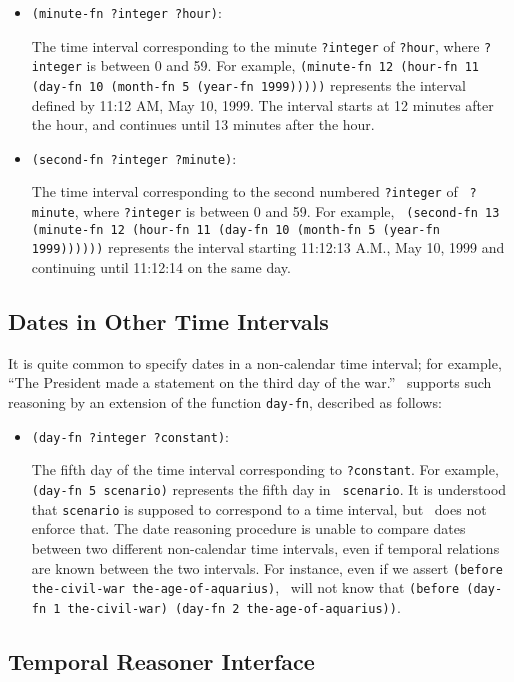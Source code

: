 \begin{itemize}
 \item{\verb'(minute-fn ?integer ?hour)':}

The time interval corresponding to the minute {\tt ?integer} of {\tt ?hour},
where {\tt ?integer} is between 0 and 59.
For example, {\tt (minute-fn 12 (hour-fn 11 (day-fn 10 (month-fn 5 (year-fn
1999)))))} represents the interval defined by 11:12 AM, May 10, 1999.  The
interval starts at 12 minutes after the hour, and continues until 13 minutes
after the hour.


 \item{\verb'(second-fn ?integer ?minute)':}

The time interval corresponding to the second numbered {\tt ?integer} of {\tt
?minute}, where {\tt ?integer} is between 0 and 59.  For example, {\tt
(second-fn 13 (minute-fn 12 (hour-fn 11 (day-fn 10 (month-fn 5 (year-fn
1999))))))} represents the interval starting 11:12:13 A.M., May 10, 1999 and
continuing until 11:12:14 on the same day.
\end{itemize}

\subsection{Dates in Other Time Intervals}

It is quite common to specify dates in a non-calendar time interval; for
example, ``The President made a statement on the third day of the war.''
\Snark\  supports such reasoning by an extension of the function {\tt day-fn},
described as follows:

\begin{itemize}
 \item{\verb'(day-fn ?integer ?constant)':}

The fifth day of the time interval corresponding to {\tt ?constant}.  For
example, {\tt (day-fn 5 scenario)} represents the fifth day in {\tt
scenario}.  It is understood that {\tt scenario} is supposed to correspond to
a time interval, but \snark\  does not enforce that.  The date reasoning
procedure is unable to compare dates between two different non-calendar time
intervals, even if temporal relations are known between the two intervals.
For instance, even if we assert {\tt (before the-civil-war
the-age-of-aquarius)}, \snark\  will not know that {\tt (before (day-fn 1
the-civil-war) (day-fn 2 the-age-of-aquarius))}.

\end{itemize}

\subsection{Temporal Reasoner Interface}


